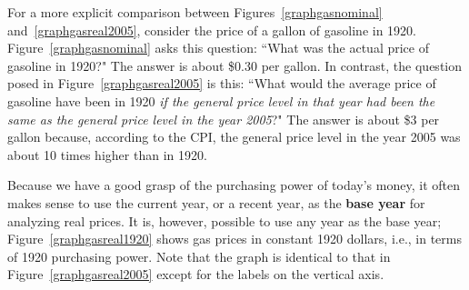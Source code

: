 For a more explicit comparison between Figures~\ref{graphgasnominal} and~\ref{graphgasreal2005}, consider the price of a gallon of gasoline in 1920. Figure~\ref{graphgasnominal} asks this question: ``What was the actual price of gasoline in 1920?" The answer is about \$0.30 per gallon. In contrast, the question posed in Figure~\ref{graphgasreal2005} is this: ``What would the average price of gasoline have been in 1920 \emph{if the general price level in that year had been the same as the general price level in the year 2005}?" The answer is about \$3 per gallon because, according to the CPI, the general price level in the year 2005 was about 10 times higher than in 1920.



Because we have a good grasp of the purchasing power of today's money, it often makes sense to use the current year, or a recent year, as the \textbf{base year} for analyzing real prices. It is, however, possible to use any year as the base year; Figure~\ref{graphgasreal1920} shows gas prices in constant 1920 dollars, i.e., in terms of 1920 purchasing power. Note that the graph is identical to that in Figure~\ref{graphgasreal2005} except for the labels on the vertical axis.




